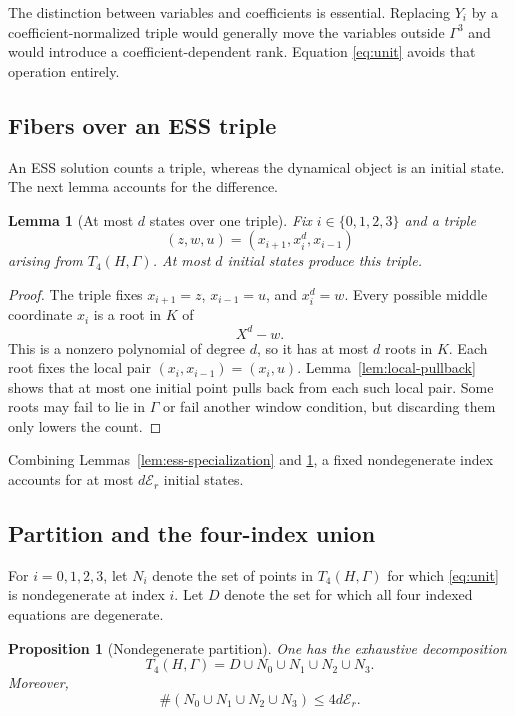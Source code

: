 \documentclass[11pt]{article}
\newtheorem{proposition}[theorem]{Proposition}
\newtheorem{lemma}[theorem]{Lemma}
\theoremstyle{definition}
\theoremstyle{remark}
\newcommand{\Er}{\mathcal{E}_{r}}
\begin{document}
The distinction between variables and coefficients is essential.  Replacing
\(Y_i\) by a coefficient-normalized triple would generally move the
variables outside \(\Gamma^3\) and would introduce a coefficient-dependent
rank.  Equation \eqref{eq:unit} avoids that operation entirely.

\subsection{Fibers over an ESS triple}

An ESS solution counts a triple, whereas the dynamical object is an initial
state.  The next lemma accounts for the difference.

\begin{lemma}[At most \(d\) states over one triple]\label{lem:d-lift}
Fix \(i\in\{0,1,2,3\}\) and a triple
\[
 (z,w,u)=(x_{i+1},x_i^d,x_{i-1})
\]
arising from \(T_4(H,\Gamma)\).  At most \(d\) initial states produce this
triple.
\end{lemma}

\begin{proof}
The triple fixes \(x_{i+1}=z\), \(x_{i-1}=u\), and \(x_i^d=w\).  Every
possible middle coordinate \(x_i\) is a root in \(K\) of
\[
 X^d-w.
\]
This is a nonzero polynomial of degree \(d\), so it has at most \(d\) roots
in \(K\).  Each root fixes the local pair \((x_i,x_{i-1})=(x_i,u)\).
Lemma~\ref{lem:local-pullback} shows that at most one initial point pulls
back from each such local pair.  Some roots may fail to lie in \(\Gamma\) or
fail another window condition, but discarding them only lowers the count.
\end{proof}

Combining Lemmas~\ref{lem:ess-specialization} and \ref{lem:d-lift}, a fixed
nondegenerate index accounts for at most \(d\Er\) initial states.

\subsection{Partition and the four-index union}

For \(i=0,1,2,3\), let \(N_i\) denote the set of points in
\(T_4(H,\Gamma)\) for which \eqref{eq:unit} is nondegenerate at index \(i\).
Let \(D\) denote the set for which all four indexed equations are
degenerate.

\begin{proposition}[Nondegenerate partition]\label{prop:nondegenerate}
One has the exhaustive decomposition
\begin{equation}\label{eq:partition}
 T_4(H,\Gamma)=D\cup N_0\cup N_1\cup N_2\cup N_3.
\end{equation}
Moreover,
\[
 \#(N_0\cup N_1\cup N_2\cup N_3)\le4d\Er.
\]
\end{proposition}
\end{document}
